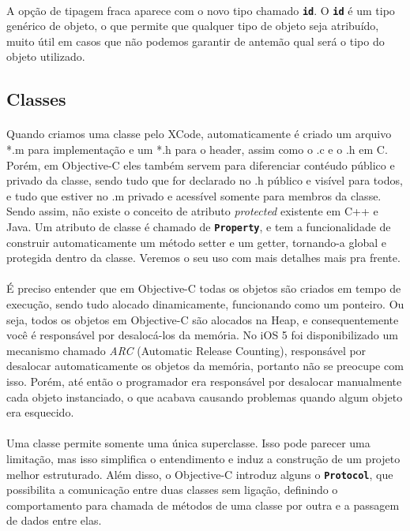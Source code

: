 \documentclass[a4paper,12pt,brazil,doubleside]{book}
\begin{document}
\paragraph{}A opção de tipagem fraca aparece com o novo tipo chamado \texttt{\textbf{id}}. O \texttt{\textbf{id}} é um tipo genérico de objeto, o que permite que qualquer tipo de objeto seja atribuído, muito útil em casos que não podemos garantir de antemão qual será o tipo do objeto utilizado.

\bigskip 

\subsection{Classes}

\paragraph{}Quando criamos uma classe pelo XCode, automaticamente é criado um arquivo *.m para implementação e um *.h para o header, assim como o .c e o .h em C. Porém, em Objective-C eles também servem para diferenciar contéudo público e privado da classe, sendo tudo que for declarado no .h público e visível para todos, e tudo que estiver no .m privado e acessível somente para membros da classe. Sendo assim, não existe o conceito de atributo \emph{protected} existente em C++ e Java. Um atributo de classe é chamado de \texttt{\textbf{Property}}, e tem a funcionalidade de construir automaticamente um método setter e um getter, tornando-a global e protegida dentro da classe. Veremos o seu uso com mais detalhes mais pra frente.

\paragraph{}É preciso entender que em Objective-C todas os objetos são criados em tempo de execução, sendo tudo alocado dinamicamente, funcionando como um ponteiro. Ou seja, todos os objetos em Objective-C são alocados na Heap, e consequentemente você é responsável por desalocá-los da memória. No iOS 5 foi disponibilizado um mecanismo chamado \emph{ARC} (Automatic Release Counting), responsável por desalocar automaticamente os objetos da memória, portanto não se preocupe com isso. Porém, até então o programador era responsável por desalocar manualmente cada objeto instanciado, o que acabava causando problemas quando algum objeto era esquecido.
\paragraph{}Uma classe permite  somente uma única superclasse. Isso pode parecer uma limitação, mas isso simplifica o entendimento e induz a construção de um projeto melhor estruturado. Além disso, o Objective-C introduz alguns o \texttt{\textbf{Protocol}}, que possibilita a comunicação entre duas classes sem ligação, definindo o comportamento para chamada de métodos de uma classe por outra e a passagem de dados entre elas.
\end{document}
